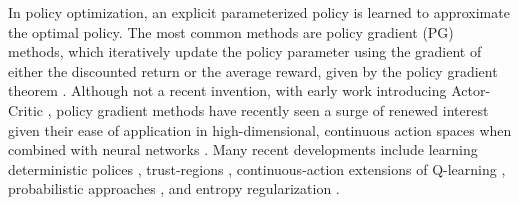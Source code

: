 \documentclass[twoside,11pt]{article}
\begin{document}
In policy optimization, an explicit parameterized policy is learned to approximate the optimal policy. The most common methods are policy gradient (PG) methods, which iteratively update the policy parameter using the gradient of either the discounted return or the average reward, given by the {policy gradient theorem} \citep{sutton2000policy}.
Although not a recent invention, with early work introducing Actor-Critic \citep{sutton1984}, policy gradient methods have recently seen a surge of renewed interest given their ease of application in high-dimensional, continuous action spaces when combined with neural networks \citep{schulman2015high,wang2016sample}. Many recent developments include learning deterministic polices \citep{silver2014deterministic,lillicrap2015continuous}, trust-regions \citep{schulman2015trust,schulman2017proximal}, continuous-action extensions of Q-learning \citep{ haarnoja2017reinforcement,lim2018actor,ryu2019caql}, probabilistic approaches \citep{abdolmaleki2018maximum,fellows2019virel}, and entropy regularization \citep{haarnoja2017reinforcement, haarnoja2018soft}.
\end{document}
